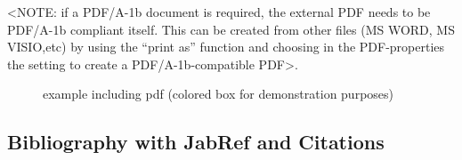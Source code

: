 <NOTE: if a PDF/A-1b document is required, the external PDF needs to be PDF/A-1b compliant itself. This
can be created from other files (\eg MS WORD, MS VISIO,etc) by using the \enquote{print as} function and
choosing in the PDF-properties the setting to create a PDF/A-1b-compatible PDF>.
\begin{figure}[htb]
\centering
{}
\caption[example including pdf]{example including pdf (colored box for demonstration purposes)}
\end{figure}%

\subsection{Bibliography with JabRef and Citations}
